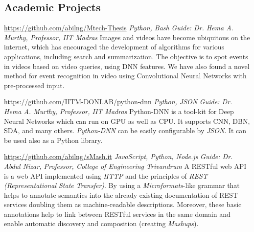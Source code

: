 \documentclass[11pt, a4paper, sans]{moderncv}
\begin{document}
\subsection{Academic Projects}
{\newline \url{https://github.com/abilng/Mtech-Thesis}}
{\hfill \textit{Python, Bash}}
{\newline \textit{Guide: Dr. Hema A. Murthy, Professor, IIT Madras}}
{Images and videos have become ubiquitous on the internet, which has encouraged the development of algorithms for various applications, including search and summarization. The objective is to spot events in videos based on video queries, using DNN features. We have also found a novel method for event recognition in video using Convolutional Neural Networks with pre-processed input.}

{\newline \url{https://github.com/IITM-DONLAB/python-dnn}}
{\hfill \textit{Python, JSON}}
{\newline \textit{Guide: Dr. Hema A. Murthy, Professor, IIT Madras}}
{Python-DNN is a tool-kit for Deep Neural Networks which can run on GPU as well as CPU. It supports CNN, DBN, SDA, and many others. \textit{Python-DNN} can be easily configurable by \textit{JSON}. It can be used also as a Python library. \newline}

{\newline \url{https://github.com/abilng/sMash.it}}
{\hfill \textit{JavaScript, Python, Node.js}}
{\newline \textit{Guide: Dr. Abdul Nizar, Professor, College of Engineering Trivandrum}}
{A RESTful web API is a web API implemented using \textit{HTTP }and the principles of \textit{REST (Representational State Transfer)}. By using  a \textit{Microformats}-like grammar that helps to annotate semantics into the already existing documentation of REST services doubling them as machine-readable descriptions. Moreover, these basic annotations help to link between RESTful services in the same domain and enable automatic discovery and composition (creating \textit{Mashups}). \newline}

\iffalse

\end{document}
